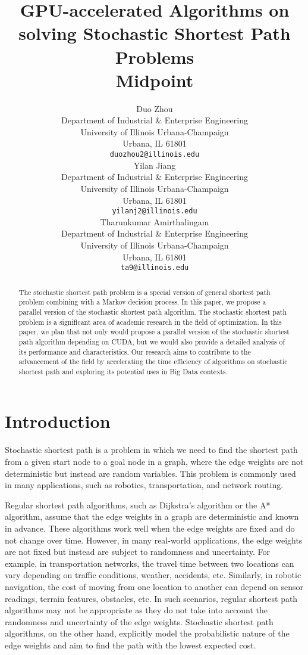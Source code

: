 \documentclass{article}
\title{GPU-accelerated Algorithms on solving Stochastic Shortest Path Problems\\ Midpoint}
\author{
  Duo Zhou\\
  Department of Industrial \& Enterprise Engineering\\
  University of Illinois Urbana-Champaign\\
  Urbana, IL 61801 \\
  \texttt{duozhou2@illinois.edu} \\
  \And
  Yilan Jiang \\
  Department of Industrial \& Enterprise Engineering\\
  University of Illinois Urbana-Champaign\\
  Urbana, IL 61801 \\
  \texttt{yilanj2@illinois.edu} \\
  \And
  Tharunkumar Amirthalingam\\
  Department of Industrial \& Enterprise Engineering\\
  University of Illinois Urbana-Champaign\\
  Urbana, IL 61801 \\
  \texttt{ta9@illinois.edu} \\
}
\begin{document}
\maketitle

\begin{abstract}
  The stochastic shortest path problem is a special version of general shortest path problem combining with 
  a Markov decision process. In this paper, we propose a parallel version of the stochastic shortest path algorithm. 
  The stochastic shortest path problem is a significant area of academic research in the field of optimization. 
  In this paper, we plan that not only would propose a parallel version of the stochastic shortest path algorithm 
  depending on CUDA, but we would also provide a detailed analysis of its performance and characteristics. 
  Our research aims to contribute to the advancement of the field by accelerating the time efficiency of algorithms 
  on stochastic shortest path and exploring its potential uses in Big Data contexts. 
\end{abstract}

\section{Introduction}

Stochastic shortest path is a problem in which we need to find the shortest path from
a given start node to a goal node in a graph, where the edge weights are not deterministic 
but instead are random variables. This problem is commonly used in many applications, 
such as robotics, transportation, and network routing.

Regular shortest path algorithms, such as Dijkstra's algorithm or the A* algorithm, 
assume that the edge weights in a graph are deterministic and known in advance. 
These algorithms work well when the edge weights are fixed and do not change over time. 
However, in many real-world applications, the edge weights are not fixed but instead are 
subject to randomness and uncertainty. For example, in transportation networks, the travel 
time between two locations can vary depending on traffic conditions, weather, accidents, etc. 
Similarly, in robotic navigation, the cost of moving from one location to another can depend 
on sensor readings, terrain features, obstacles, etc. In such scenarios, regular shortest path 
algorithms may not be appropriate as they do not take into account the randomness and uncertainty 
of the edge weights. Stochastic shortest path algorithms, on the other hand, explicitly model the 
probabilistic nature of the edge weights and aim to find the path with the lowest expected cost.
\end{document}
